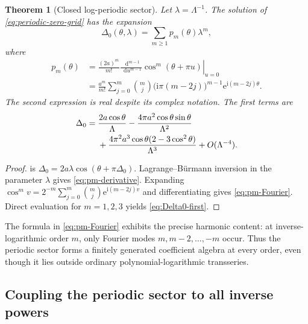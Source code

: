 \documentclass[11pt,a4paper,oneside]{article}
\theoremstyle{plain}
\newtheorem{theorem}{Theorem}[section]
\theoremstyle{definition}
\theoremstyle{remark}
\newcommand{\e}{\mathrm e}
\newcommand{\dd}{\mathop{}\!\mathrm d}
\newcommand{\ii}{\mathrm i}
\begin{document}
\begin{theorem}[Closed log-periodic sector]
\label{thm:periodic-zero-sector}
Let $\lambda=\Lambda^{-1}$.  The solution of
\cref{eq:periodic-zero-grid} has the expansion
\begin{equation}
 \Delta_0(\theta,\lambda)
 =\sum_{m\ge1}p_m(\theta)\lambda^m,
 \label{eq:Delta0-expansion}
\end{equation}
where
\begin{align}
 p_m(\theta)
 &={\frac{(2a)^m}{m!}}
 \left.\frac{\dd^{m-1}}{\dd u^{m-1}}
 \cos^m(\theta+\pi u)\right|_{u=0}
 \label{eq:pm-derivative}\\
 &=\frac{a^m}{m!}
 \sum_{j=0}^{m}\binom mj
 \bigl(\ii\pi(m-2j)\bigr)^{m-1}
 \e^{\ii(m-2j)\theta}.
 \label{eq:pm-Fourier}
\end{align}
The second expression is real despite its complex notation.  The first terms
are
\begin{align}
 \Delta_0={}&\frac{2a\cos\theta}{\Lambda}
 -\frac{4\pi a^2\cos\theta\sin\theta}{\Lambda^2}
 \notag\\
 &+\frac{4\pi^2a^3\cos\theta(2-3\cos^2\theta)}{\Lambda^3}
 +O(\Lambda^{-4}).
 \label{eq:Delta0-first}
\end{align}
\end{theorem}

\begin{proof}
 is
$\Delta_0=2a\lambda\cos(\theta+\pi\Delta_0)$.  Lagrange--B\"urmann inversion
in the parameter $\lambda$ gives \cref{eq:pm-derivative}.  Expanding
$\cos^m v=2^{-m}\sum_{j=0}^m\binom mj\e^{\ii(m-2j)v}$ and differentiating
gives \cref{eq:pm-Fourier}.  Direct evaluation for $m=1,2,3$ yields
\cref{eq:Delta0-first}.
\end{proof}

The formula in \cref{eq:pm-Fourier} exhibits the precise harmonic content: at
inverse-logarithmic order $m$, only Fourier modes
$m,m-2,\ldots,-m$ occur.  Thus the periodic sector forms a finitely generated
coefficient algebra at every order, even though it lies outside ordinary
polynomial-logarithmic transseries.

\subsection{Coupling the periodic sector to all inverse powers}
\end{document}

